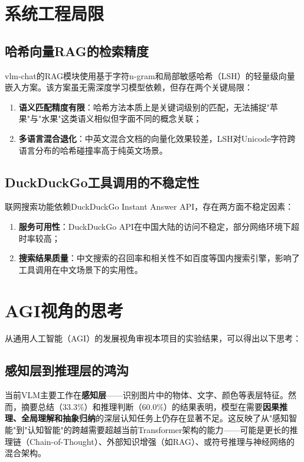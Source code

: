\section{系统工程局限}

\subsection{哈希向量RAG的检索精度}

vlm-chat的RAG模块使用基于字符n-gram和局部敏感哈希（LSH）的轻量级向量嵌入方案。该方案虽无需深度学习模型依赖，但存在两个关键局限：
\begin{enumerate}
  \item \textbf{语义匹配精度有限}：哈希方法本质上是关键词级别的匹配，无法捕捉"苹果"与"水果"这类语义相似但字面不同的概念关联；
  \item \textbf{多语言混合退化}：中英文混合文档的向量化效果较差，LSH对Unicode字符跨语言分布的哈希碰撞率高于纯英文场景。
\end{enumerate}

\subsection{DuckDuckGo工具调用的不稳定性}

联网搜索功能依赖DuckDuckGo Instant Answer API，存在两方面不稳定因素：
\begin{enumerate}
  \item \textbf{服务可用性}：DuckDuckGo API在中国大陆的访问不稳定，部分网络环境下超时率较高；
  \item \textbf{搜索结果质量}：中文搜索的召回率和相关性不如百度等国内搜索引擎，影响了工具调用在中文场景下的实用性。
\end{enumerate}

\section{AGI视角的思考}

从通用人工智能（AGI）的发展视角审视本项目的实验结果，可以得出以下思考：

\subsection{感知层到推理层的鸿沟}

当前VLM主要工作在\textbf{感知层}——识别图片中的物体、文字、颜色等表层特征。然而，摘要总结（33.3\%）和推理判断（60.0\%）的结果表明，模型在需要\textbf{因果推理、全局理解和抽象归纳}的深层认知任务上仍存在显著不足。这反映了从"感知智能"到"认知智能"的跨越需要超越当前Transformer架构的能力——可能是更长的推理链（Chain-of-Thought）、外部知识增强（如RAG）、或符号推理与神经网络的混合架构。

